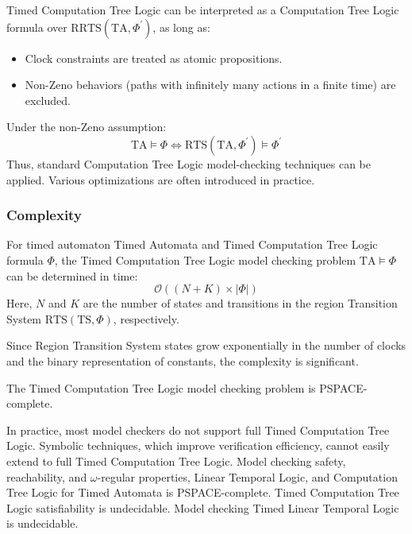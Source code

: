 Timed Computation Tree Logic can be interpreted as a Computation Tree Logic formula over R$\text{RTS}(\text{TA},\Phi^\prime)$, as long as:
\begin{itemize}
    \item Clock constraints are treated as atomic propositions.
    \item Non-Zeno behaviors (paths with infinitely many actions in a finite time) are excluded.
\end{itemize}
\noindent Under the non-Zeno assumption:
\[\text{TA}\models\Phi\Leftrightarrow\text{RTS}(\text{TA},\Phi^\prime)\models\Phi^\prime\]
\noindent Thus, standard Computation Tree Logic model-checking techniques can be applied. Various optimizations are often introduced in practice.

\subsubsection{Complexity}
\begin{theorem}
    For timed automaton Timed Automata and Timed Computation Tree Logic formula $\Phi$, the Timed Computation Tree Logic model checking problem $\text{TA}\models\Phi$ can be determined in time: 
    \[\mathcal{O}((N+K)\times\left\lvert \Phi\right\rvert )\] 
    Here, $N$ and $K$ are the number of states and transitions in the region Transition System $\text{RTS}(\text{TS},\Phi)$, respectively. 
\end{theorem}
\noindent Since Region Transition System states grow exponentially in the number of clocks and the binary representation of constants, the complexity is significant.
\begin{theorem}
    The Timed Computation Tree Logic model checking problem is PSPACE-complete.
\end{theorem}

In practice, most model checkers do not support full Timed Computation Tree Logic.
Symbolic techniques, which improve verification efficiency, cannot easily extend to full Timed Computation Tree Logic.
Model checking safety, reachability, and $\omega$-regular properties, Linear Temporal Logic, and Computation Tree Logic for Timed Automata is PSPACE-complete.
Timed Computation Tree Logic satisfiability is undecidable.
Model checking Timed Linear Temporal Logic is undecidable.